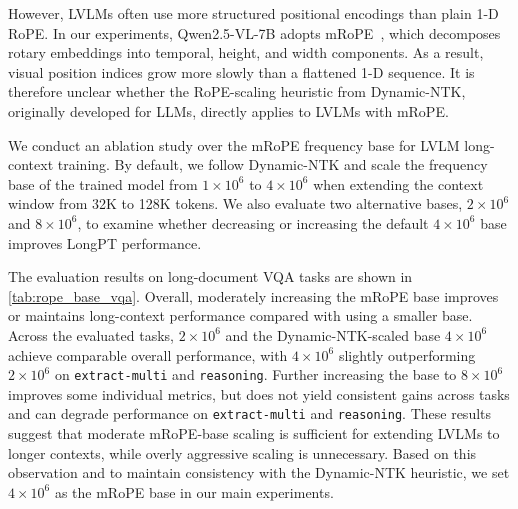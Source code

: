 \documentclass{llmxive}
\providecommand{\extractmulti}{\texttt{extract-multi}\xspace}
\providecommand{\reasoningtask}{\texttt{reasoning}\xspace}
\begin{document}
{{{{{However, LVLMs often use more structured positional encodings than plain 1-D RoPE.
In our experiments, Qwen2.5-VL-7B adopts mRoPE~\citep{wang2024qwen2}, which decomposes rotary embeddings into temporal, height, and width components.
As a result, visual position indices grow more slowly than a flattened 1-D sequence.
It is therefore unclear whether the RoPE-scaling heuristic from Dynamic-NTK, originally developed for LLMs, directly applies to LVLMs with mRoPE.

We conduct an ablation study over the mRoPE frequency base for LVLM long-context training.
By default, we follow Dynamic-NTK and scale the frequency base of the trained model from $1\times 10^6$ to $4\times 10^6$ when extending the context window from 32K to 128K tokens.
We also evaluate two alternative bases, $2\times 10^6$ and $8\times 10^6$, to examine whether decreasing or increasing the default $4\times 10^6$ base improves LongPT performance.

The evaluation results on long-document VQA tasks are shown in \cref{tab:rope_base_vqa}.
Overall, moderately increasing the mRoPE base improves or maintains long-context performance compared with using a smaller base.
Across the evaluated tasks, $2\times 10^6$ and the Dynamic-NTK-scaled base $4\times 10^6$ achieve comparable overall performance, with $4\times 10^6$ slightly outperforming $2\times 10^6$ on \extractmulti and \reasoningtask.
Further increasing the base to $8\times 10^6$ improves some individual metrics, but does not yield consistent gains across tasks and can degrade performance on \extractmulti and \reasoningtask.
These results suggest that moderate mRoPE-base scaling is sufficient for extending LVLMs to longer contexts, while overly aggressive scaling is unnecessary.
Based on this observation and to maintain consistency with the Dynamic-NTK heuristic, we set $4\times 10^6$ as the mRoPE base in our main experiments.

}}}}}
\end{document}
